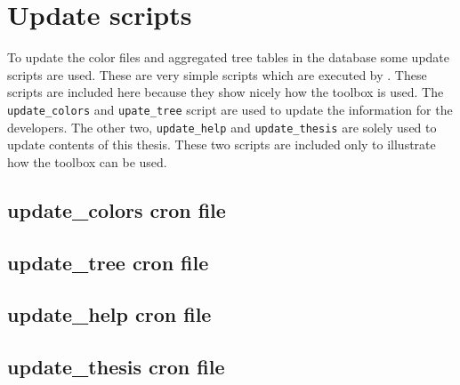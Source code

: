 \chapter{Update scripts}

To update the color files and aggregated tree tables in the database some update scripts are used. These are very simple  scripts which are executed by . These scripts are included here because they show nicely how the toolbox is used. The \verb|update_colors| and \verb|upate_tree| script are used to update the information for the developers. The other two, \verb|update_help| and \verb|update_thesis| are solely used to update contents of this thesis. These two scripts are included only to illustrate how the toolbox can be used.

\section{update\_colors cron file\label{sec:update_colors}}\nopagebreak{}

\section{update\_tree cron file\label{sec:update_tree}}\nopagebreak{}

\section{update\_help cron file\label{sec:update_help}}\nopagebreak{}

\section{update\_thesis cron file\label{sec:update_thesis}}\nopagebreak{}